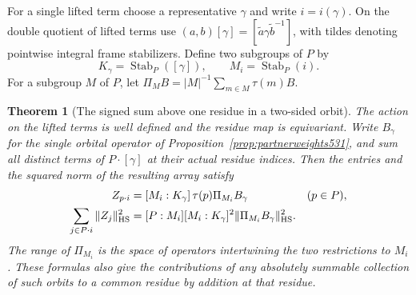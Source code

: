 \documentclass[a4paper,11pt]{article}
\newtheorem{theorem}[proposition]{Theorem}
\theoremstyle{definition}
\theoremstyle{remark}
\numberwithin{equation}{section}
\begin{document}
For a single lifted term choose a representative \(\gamma\) and
write \(i=i(\gamma)\). On the double quotient of lifted terms
use \((a,b)[\gamma]=[\tilde a\gamma\tilde b^{-1}]\), with tildes
denoting pointwise integral frame stabilizers. Define two
subgroups of \(P\) by
\[
  K_\gamma=\operatorname{Stab}_P([\gamma]),\qquad
  M_i=\operatorname{Stab}_P(i).
\]
For a subgroup \(M\) of \(P\), let
\(\Pi_M B=|M|^{-1}\sum_{m\in M}\tau(m)B\).

\begin{theorem}[The signed sum above one residue in a two-sided orbit]
\leavevmode\label{thm:orbitaverage532}
The action on the lifted terms is well defined and the residue map
is equivariant. Write \(B_\gamma\) for the single orbital operator
of Proposition~\ref{prop:partnerweights531}, and sum all distinct
terms of \(P\cdot[\gamma]\) at their actual residue indices.
Then the entries and the squared norm of the resulting array satisfy
\begin{align*}
    Z_{p\cdot i}&=[M_i:K_\gamma]\,\tau(p)\Pi_{M_i}B_\gamma
                                  &&(p\in P),\\
    \sum_{j\in P\cdot i}\|Z_j\|_{\rm HS}^2
       &=[P:M_i][M_i:K_\gamma]^2\|\Pi_{M_i}B_\gamma\|_{\rm HS}^2 .
\end{align*}
The range of \(\Pi_{M_i}\)
is the space of operators intertwining the two restrictions to
\(M_i\). These formulas also give the contributions of any
absolutely summable collection of such orbits to a common residue
by addition at that residue.
\end{theorem}
\end{document}
